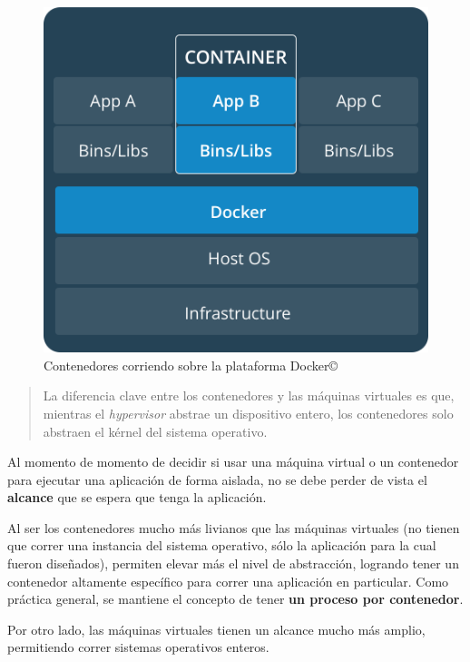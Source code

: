 \documentclass[14pt]{extarticle}
\newcommand{\docker}{Docker\copyright}
\begin{document}
        \begin{figure}
            \includegraphics[scale=0.30]{containers.png}
            \caption{Contenedores corriendo sobre la plataforma \docker{}}
        \end{figure}

        \begin{quote}
            La diferencia clave entre los contenedores y las máquinas virtuales es que, mientras el \textit{hypervisor} abstrae un dispositivo entero, los contenedores solo abstraen el kérnel del sistema operativo. \cite{dockerdarnpopular}
        \end{quote}

        Al momento de momento de decidir si usar una máquina virtual o un contenedor para ejecutar una aplicación de forma aislada, no se debe perder de vista el \textbf{alcance} que se espera que tenga la aplicación.\cite{cloudinfrastructure}

        Al ser los contenedores mucho más livianos que las máquinas virtuales (no tienen que correr una instancia del sistema operativo, sólo la aplicación para la cual fueron diseñados), permiten elevar más el nivel de abstracción, logrando tener un contenedor altamente específico para correr una aplicación en particular.  Como práctica general, se mantiene el concepto de tener \textbf{un proceso por contenedor}.

        Por otro lado, las máquinas virtuales tienen un alcance mucho más amplio, permitiendo correr sistemas operativos enteros.  
\end{document}
